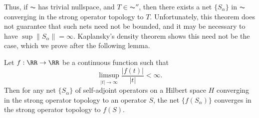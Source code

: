 Thus, if $\AC$ has trivial nullspace, and $T \in \AC''$, then there exists a net $\{ S_\alpha \}$ in $\AC$ converging in the strong operator topology to $T$. Unfortunately, this theorem does not guarantee that such nets need not be bounded, and it may be necessary to have $\sup \| S_\alpha \| = \infty$. Kaplansky's density theorem shows this need not be the case, which we prove after the following lemma.

\begin{lemma}
    Let $f: \RR \to \RR$ be a continuous function such that
    \[ \limsup_{|t| \to \infty} \frac{|f(t)|}{|t|} < \infty. \]
    Then for any net $\{ S_\alpha \}$ of self-adjoint operators on a Hilbert space $H$ converging in the strong operator topology to an operator $S$, the net $\{ f(S_\alpha) \}$ converges in the strong operator topology to $f(S)$.
\end{lemma}
